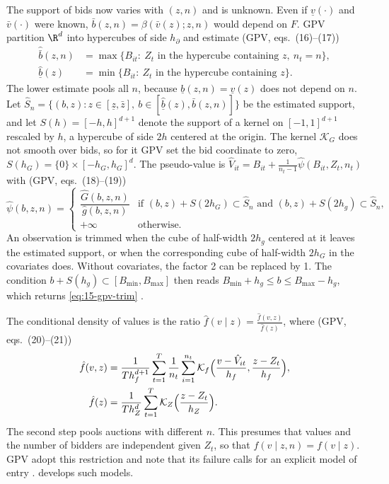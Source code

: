  The support of bids now varies with $(z,n)$ and is unknown. Even if $\underline v(\cdot)$ and $\bar v(\cdot)$ were known, $\bar b(z,n)=\beta(\bar v(z);z,n)$ would depend on $F$. GPV partition $\R^d$ into hypercubes of side $h_\partial$ and estimate (GPV, eqs.~(16)--(17))
\begin{align*}
\hat{\bar b}(z,n)&=\max\{B_{it}:\ Z_t\text{ in the hypercube containing }z,\ n_t=n\},\\
\hat{\underline b}(z)&=\min\{B_{it}:\ Z_t\text{ in the hypercube containing }z\}.
\end{align*}
The lower estimate pools all $n$, because $\underline b(z,n)=\underline v(z)$ does not depend on $n$. Let $\hat S_n=\{(b,z):z\in[\underline z,\bar z],\ b\in[\hat{\underline b}(z),\hat{\bar b}(z,n)]\}$ be the estimated support, and let $S(h)=[-h,h]^{d+1}$ denote the support of a kernel on $[-1,1]^{d+1}$ rescaled by $h$, a hypercube of side $2h$ centered at the origin. The kernel $\mathcal K_G$ does not smooth over bids, so for it GPV set the bid coordinate to zero, $S(h_G)=\{0\}\times[-h_G,h_G]^d$. The pseudo-value is $\hat V_{it}=B_{it}+\frac{1}{n_t-1}\hat\psi(B_{it},Z_t,n_t)$ with (GPV, eqs.~(18)--(19))
\begin{equation}\label{eq:15-gpv-trim-z}
\hat\psi(b,z,n)=\begin{cases}
\dfrac{\hat G(b,z,n)}{\hat g(b,z,n)}&\text{if }(b,z)+S(2h_G)\subset\hat S_n\text{ and }(b,z)+S(2h_g)\subset\hat S_n,\\[2ex]
+\infty&\text{otherwise.}
\end{cases}
\end{equation}
An observation is trimmed when the cube of half-width $2h_g$ centered at it leaves the estimated support, or when the corresponding cube of half-width $2h_G$ in the covariates does. Without covariates, the factor 2 can be replaced by 1. The condition $b+S(h_g)\subset[B_{\min},B_{\max}]$ then reads $B_{\min}+h_g\le b\le B_{\max}-h_g$, which returns \eqref{eq:15-gpv-trim} \citep[footnote 20]{GuerrePerrigneVuong2000}.

 The conditional density of values is the ratio $\hat f(v\mid z)=\frac{\hat f(v,z)}{\hat f(z)}$, where (GPV, eqs.~(20)--(21))
\begin{align}
\hat f(v,z)&=\frac{1}{Th_f^{d+1}}\sum_{t=1}^T\frac{1}{n_t}\sum_{i=1}^{n_t}\mathcal K_f\Big(\frac{v-\hat V_{it}}{h_f},\frac{z-Z_t}{h_f}\Big),\label{eq:15-gpv-fhat-z}\\
\hat f(z)&=\frac{1}{Th_Z^d}\sum_{t=1}^T\mathcal K_Z\Big(\frac{z-Z_t}{h_Z}\Big).\notag
\end{align}
The second step pools auctions with different $n$. This presumes that values and the number of bidders are independent given $Z_t$, so that $f(v\mid z,n)=f(v\mid z)$. GPV adopt this restriction and note that its failure calls for an explicit model of entry \citep[footnote 14]{GuerrePerrigneVuong2000}.  develops such models.


